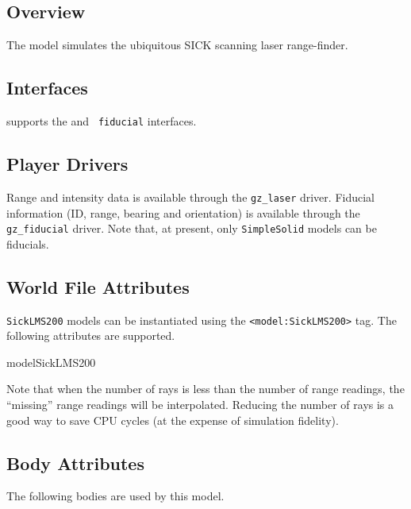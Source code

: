 

\subsection{Overview}

The {\tt \modelName} model simulates the ubiquitous SICK scanning
laser range-finder.


\subsection{\libgazebo Interfaces}

{\tt \modelName} supports the  and {\tt
fiducial} interfaces.


\subsection{Player Drivers}

Range and intensity data is available through the {\tt gz\_laser}
driver.  Fiducial information (ID, range, bearing and orientation) is
available through the {\tt gz\_fiducial} driver.  Note that, at
present, only {\tt SimpleSolid} models can be fiducials.


\subsection{World File Attributes}

{\tt SickLMS200} models can be instantiated using the
\verb+<model:SickLMS200>+ tag.  The following attributes are
supported.

\begin{xmlattrtable}{model}{SickLMS200}
\modeldefaults
{}
\end{xmlattrtable}

\indent Note that when the number of rays is less than the number of range
readings, the ``missing'' range readings will be interpolated.
Reducing the number of rays is a good way to save CPU cycles (at the
expense of simulation fidelity).



\subsection{Body Attributes}

The following bodies are used by this model.

\begin{bodyattrtable}
\bodydefaults
\end{bodyattrtable}









